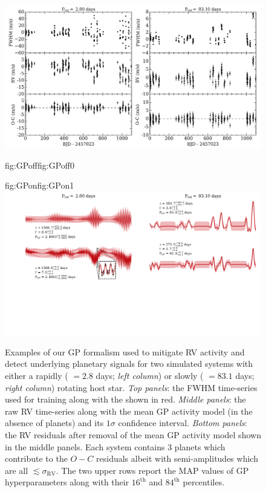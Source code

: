 \begin{figure}
  \centering
  \includegraphics[width=\hsize]{figures/GPexample_bkgd.png}%
  \hspace{-\hsize}%
  \begin{ocg}{fig:GPoff}{fig:GPoff}{0}%
  \end{ocg}%
  \begin{ocg}{fig:GPon}{fig:GPon}{1}%
    \includegraphics[width=\hsize]{figures/GPexample_GP.png}%
  \end{ocg}
  \hspace{-\hsize}%
  \caption[Examples of GP activity models in simulated SPIRou timeseries.]
      {\small Examples of our GP formalism used to mitigate RV activity and detect underlying planetary signals for two
    simulated systems with either a rapidly (\prot{} $=2.8$ days; \emph{left column}) or slowly (\prot{} $=83.1$ days;
    \emph{right column}) rotating host star. \emph{Top panels}: the FWHM time-series used for training along with the
    shown in red. \emph{Middle panels}: the raw
    RV time-series along with the mean GP activity model (in the absence of planets) and its $1\sigma$ confidence interval.
    \emph{Bottom panels}: the RV residuals after removal of the mean GP activity model shown in the middle panels.
    Each system contains 3 planets which contribute to the $O-C$ residuals albeit with semi-amplitudes which are all
    $\lesssim \sigma_{\text{RV}}$. The two upper rows report the MAP values of GP hyperparameters along with their
    $16^{\text{th}}$ and $84^{\text{th}}$ percentiles.}
  \label{BSfig:GPexample}
\end{figure}

